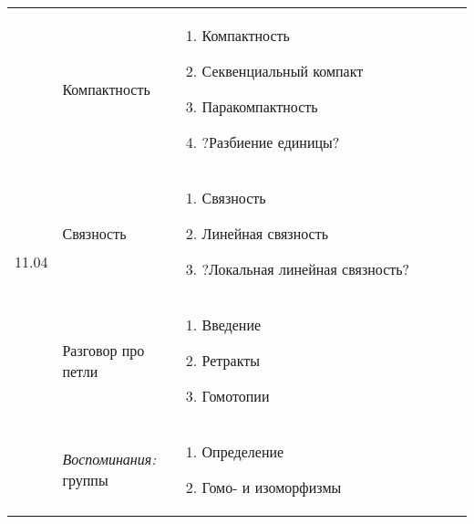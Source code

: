 \documentclass[a4paper,14pt]{extarticle}
\begin{document}
\begin{longtable}{|p{0.1\linewidth}|p{0.25\linewidth}|p{0.65\linewidth}|}
                                        \\
      \hline
      \multirow{4}{*}{11.04} & Компактность & 
                                        \begin{enumerate}
                                            \item Компактность
                                            \item Секвенциальный компакт
                                            \item Паракомпактность
                                            \item ?Разбиение единицы?
                                        \end{enumerate} \\
      \cline{2-3}
                             & Связность & 
                                        \begin{enumerate}
                                            \item Связность
                                            \item Линейная связность
                                            \item ?Локальная линейная связность?
                                        \end{enumerate}
                                        \\
      \cline{2-3}
                             & Разговор про петли & 
                                        \begin{enumerate}
                                            \item Введение
                                            \item Ретракты
                                            \item Гомотопии
                                        \end{enumerate}
                                        \\
      \cline{2-3}
                             & \textit{Воспоминания:} группы &
                                        \begin{enumerate}
                                            \item Определение
                                            \item Гомо- и изоморфизмы
                                        \end{enumerate}

\end{longtable}
\end{document}
